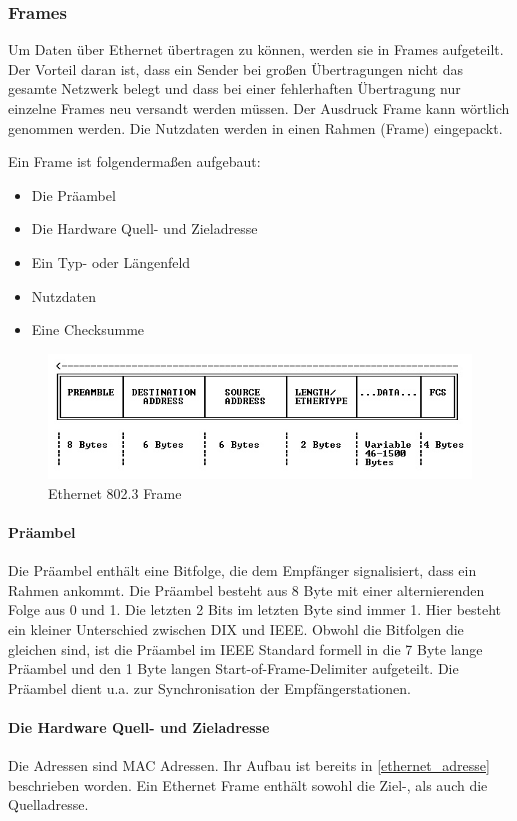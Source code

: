 \documentclass[12pt, a4paper, ngerman]{article}
\begin{document}
 \subsubsection{Frames}
Um Daten über Ethernet übertragen zu können, werden sie in Frames aufgeteilt. Der Vorteil daran ist, dass ein Sender bei großen Übertragungen nicht das gesamte Netzwerk belegt und dass bei einer fehlerhaften Übertragung nur einzelne Frames neu versandt werden müssen. Der Ausdruck Frame kann wörtlich genommen werden. Die Nutzdaten werden in einen Rahmen (Frame) eingepackt.

Ein Frame ist folgendermaßen aufgebaut:
\begin{itemize}
	\item Die Präambel 
	\item Die Hardware Quell- und Zieladresse
	\item Ein Typ- oder Längenfeld
	\item Nutzdaten
	\item Eine Checksumme
\end{itemize}
\begin{figure}[H]
	\centering
	\includegraphics[width=0.9\linewidth]{Grafiken/ethernet_frame.jpg}
	\caption{Ethernet 802.3 Frame \cite{ethernet_frame}}
	\label{ethernet_frame}
\end{figure}

\paragraph{Präambel}
Die Präambel enthält eine Bitfolge, die dem Empfänger signalisiert, dass ein Rahmen ankommt. Die Präambel besteht aus 8 Byte mit einer alternierenden Folge aus 0 und 1. Die letzten 2 Bits im letzten Byte sind immer 1. Hier besteht ein kleiner Unterschied zwischen DIX und IEEE. Obwohl die Bitfolgen die gleichen sind, ist die Präambel im IEEE Standard formell in die 7 Byte lange Präambel und den 1 Byte langen Start-of-Frame-Delimiter aufgeteilt.
Die Präambel dient u.a. zur Synchronisation der Empfängerstationen. 

\paragraph{ Die Hardware Quell- und Zieladresse}
Die Adressen sind MAC Adressen. Ihr Aufbau ist bereits in \ref{ethernet_adresse} beschrieben worden. Ein Ethernet Frame enthält sowohl die Ziel-, als auch die Quelladresse.
\end{document}
